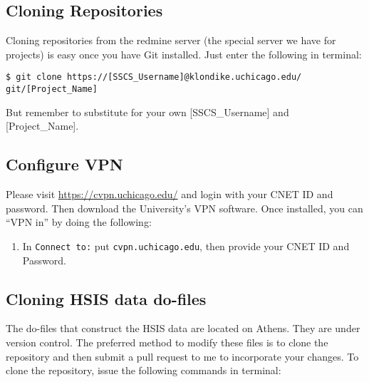 \documentclass{article}
\begin{document}
	\subsection*{Cloning Repositories} \label{sec:cloneredmine}
	Cloning repositories from the redmine server (the special server we have
	for projects) is easy once you have Git installed. Just enter the following
	in terminal: 

	\vspace{0.5cm}

	\begin{raggedright}
	\newbox{\mybox}
	\begin{lrbox}{\mybox}
	\begin{minipage}{\linewidth}
	\begin{lstlisting}[basicstyle=\small\ttfamily\color{white}]
$ git clone https://[SSCS_Username]@klondike.uchicago.edu/
git/[Project_Name]
	\end{lstlisting}
	\end{minipage}
	\end{lrbox}
	\colorbox{black}{\usebox{\mybox}}
		
	\end{raggedright}

	\vspace{0.5cm}
	\noindent But remember to substitute for your own [SSCS\_Username] and [Project\_Name]. 

	\subsection*{Configure VPN} \label{sec:vpn}
	Please visit \url{https://cvpn.uchicago.edu/} and login with your CNET ID and
	password. Then download the University's VPN software. Once installed, you can
	``VPN in'' by doing the following:

	\begin{enumerate}
		\item In \texttt{Connect to:} put \texttt{cvpn.uchicago.edu}, then provide
		your CNET ID and Password.
	\end{enumerate}

	\subsection*{Cloning HSIS data do-files} \label{sec:clonehsis}
	The do-files that construct the HSIS data are located on Athens. They are 
	under version control. The preferred method to modify these files is
	to clone the repository and then submit a pull request to me to incorporate
	your changes. To clone the repository, issue the following commands in
	terminal:
\end{document}
